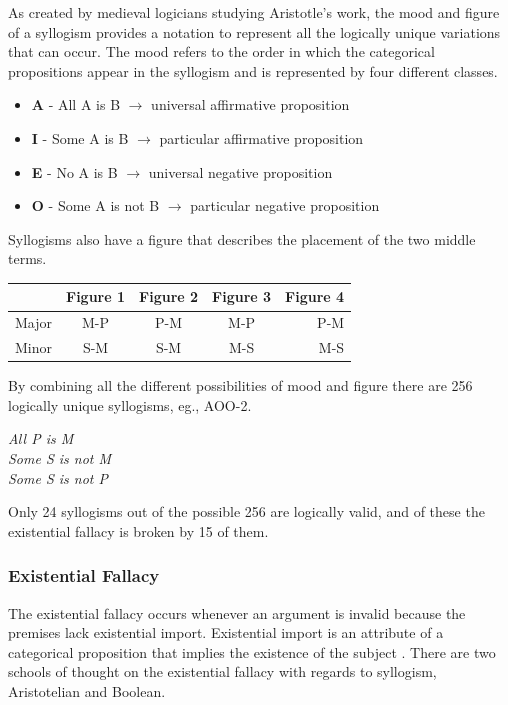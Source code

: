 \documentclass[12pt,a4paper]{report}
\newenvironment{tightcenter}{%
  \setlength\topsep{0pt}
  \setlength\parskip{0pt}
  \begin{center}
}{%
  \end{center}
}
\begin{document}
As created by medieval logicians studying Aristotle's work, the mood and figure of a syllogism provides a notation to represent all the logically unique variations that can occur. The mood refers to the order in which the categorical propositions appear in the syllogism and is represented by four different classes.%
\begin{itemize}
\item \textbf{A} - All A is B $\rightarrow$ universal affirmative proposition
\item \textbf{I} - Some A is B $\rightarrow$ particular affirmative proposition
\item \textbf{E} - No A is B $\rightarrow$ universal negative  proposition
\item \textbf{O} - Some A is not B  $\rightarrow$  particular negative proposition
\end{itemize}
Syllogisms also have a figure that describes the placement of the two middle terms.

\begin{center}
  \begin{tabular}{ l | c | c | c | r }
     & Figure 1 & Figure 2 & Figure 3 & Figure 4 \\ \hline
    Major & M-P & P-M & M-P & P-M \\ \hline
    Minor & S-M & S-M & M-S & M-S \\
  \end{tabular}
\end{center}

By combining all the different possibilities of mood and figure there are 256 logically unique syllogisms, eg., AOO-2. 
\bigbreak
\begin{tightcenter}
\textit{All P is M}\\ 
\textit{Some S is not M}\\
\textit{Some S is not P}\\
\end{tightcenter}
\bigbreak

Only 24 syllogisms out of the possible 256 are logically valid, and of these the existential fallacy is broken by 15 of them.

\subsubsection{Existential Fallacy}

The existential fallacy occurs whenever an argument is invalid because the premises lack existential import. Existential import is an attribute of a categorical proposition that implies the existence of the subject \citep{hurley2005concise}. There are two schools of thought on the existential fallacy with regards to syllogism, Aristotelian and Boolean.
\end{document}
